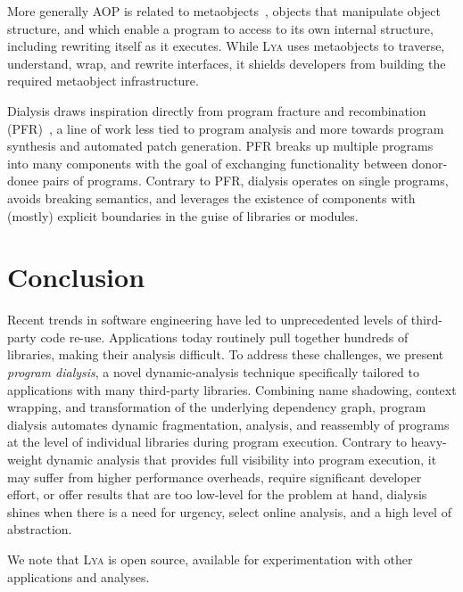 \documentclass[letterpaper,twocolumn,10pt]{article}
\newcommand{\sys}{{\scshape Lya}\xspace}
\newcommand{\fra}{fragmentation\xspace} %
\newcommand{\ana}{analysis\xspace}      %
\newcommand{\ass}{reassembly\xspace}    %
\begin{document}
More generally AOP is related to metaobjects~\cite{metaobject}, objects that manipulate object structure, and which enable a program to access to its own internal structure, including rewriting itself as it executes.
While \sys uses metaobjects to traverse, understand, wrap, and rewrite interfaces, it shields developers from building the required metaobject infrastructure.

Dialysis draws inspiration directly from program fracture and recombination (PFR)~\cite{fracture1, fracture3}, a line of work less tied to program analysis and more towards program synthesis and automated patch generation.
PFR breaks up multiple programs into many components with the goal of exchanging functionality between donor-donee pairs of programs.
Contrary to PFR, dialysis operates on single programs, avoids breaking semantics, and leverages the existence of components with (mostly) explicit boundaries in the guise of libraries or modules.

\section{Conclusion}
\label{end}

Recent trends in software engineering have led to unprecedented levels of third-party code re-use.
Applications today routinely pull together hundreds of libraries, making their analysis difficult.
To address these challenges, we present \emph{program dialysis}, a novel dynamic-analysis technique specifically tailored to applications with many third-party libraries.
Combining name shadowing, context wrapping, and transformation of the underlying dependency graph, program dialysis automates dynamic \fra, \ana, and \ass of programs at the level of individual libraries during program execution.
Contrary to heavy-weight dynamic analysis that provides full visibility into program execution, it may suffer from higher performance overheads, require significant developer effort, or offer results that are too low-level for the problem at hand, dialysis shines when there is a need for urgency, select online analysis, and a high level of abstraction.

We note that \sys is open source, available for experimentation with other applications and analyses.




\end{document}
